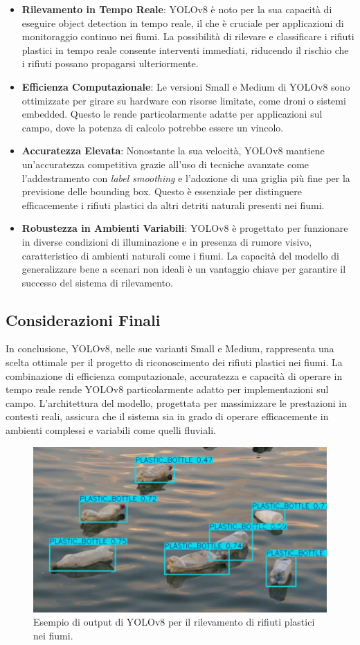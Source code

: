 \begin{itemize}
    \item \textbf{Rilevamento in Tempo Reale}: YOLOv8 è noto per la sua capacità di eseguire object detection in tempo reale, il che è cruciale per applicazioni di monitoraggio continuo nei fiumi. La possibilità di rilevare e classificare i rifiuti plastici in tempo reale consente interventi immediati, riducendo il rischio che i rifiuti possano propagarsi ulteriormente.
    
    \item \textbf{Efficienza Computazionale}: Le versioni Small e Medium di YOLOv8 sono ottimizzate per girare su hardware con risorse limitate, come droni o sistemi embedded. Questo le rende particolarmente adatte per applicazioni sul campo, dove la potenza di calcolo potrebbe essere un vincolo.
    
    \item \textbf{Accuratezza Elevata}: Nonostante la sua velocità, YOLOv8 mantiene un'accuratezza competitiva grazie all'uso di tecniche avanzate come l'addestramento con \textit{label smoothing} e l'adozione di una griglia più fine per la previsione delle bounding box. Questo è essenziale per distinguere efficacemente i rifiuti plastici da altri detriti naturali presenti nei fiumi.
    
    \item \textbf{Robustezza in Ambienti Variabili}: YOLOv8 è progettato per funzionare in diverse condizioni di illuminazione e in presenza di rumore visivo, caratteristico di ambienti naturali come i fiumi. La capacità del modello di generalizzare bene a scenari non ideali è un vantaggio chiave per garantire il successo del sistema di rilevamento.
\end{itemize}

\subsection{Considerazioni Finali}

In conclusione, YOLOv8, nelle sue varianti Small e Medium, rappresenta una scelta ottimale per il progetto di riconoscimento dei rifiuti plastici nei fiumi. La combinazione di efficienza computazionale, accuratezza e capacità di operare in tempo reale rende YOLOv8 particolarmente adatto per implementazioni sul campo. L'architettura del modello, progettata per massimizzare le prestazioni in contesti reali, assicura che il sistema sia in grado di operare efficacemente in ambienti complessi e variabili come quelli fluviali.

\begin{figure}[h!]
    \centering
    \includegraphics[width=\textwidth]{res_1203_1.jpg} 
    \caption{Esempio di output di YOLOv8 per il rilevamento di rifiuti plastici nei fiumi.}
    \label{fig:yolov8_output}
\end{figure}
